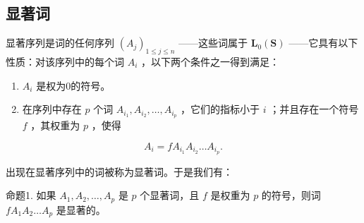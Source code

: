\subsection{显著词}

显著序列是词的任何序列 \((A_{j})_{1\leqslant j\leqslant n}\) ——这些词属于 \(\mathbf{L}_{0}(\mathbf{S})\) ——它具有以下性质：对该序列中的每个词 \(A_{i}\) ，以下两个条件之一得到满足：

\begin{enumerate}
\def\labelenumi{(\arabic{enumi})}
\item
  \(A_{i}\) 是权为0的符号。
\item
  在序列中存在 \(p\) 个词 \(A_{i_1}, A_{i_2}, \ldots, A_{i_p}\) ，它们的指标小于 \(i\) ；并且存在一个符号 \(f\) ，其权重为 \(p\) ，使得
\end{enumerate}

\[
A _ {i} = f A _ {i _ {1}} A _ {i _ {2}} \dots A _ {i _ {p}}.
\]

出现在显著序列中的词被称为显著词。于是我们有：

命题1. 如果 \(A_1, A_2, \ldots, A_p\) 是 \(p\) 个显著词，且 \(f\) 是权重为 \(p\) 的符号，则词 \(fA_1A_2 \ldots A_p\) 是显著的。

